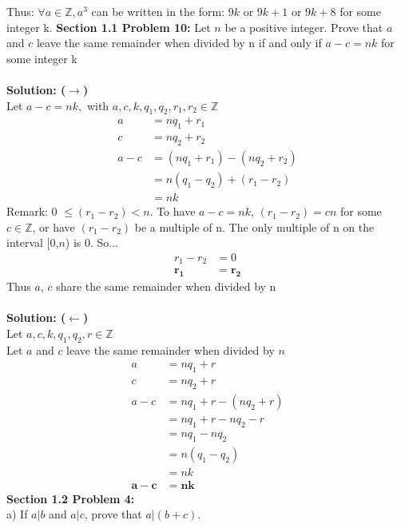 \documentclass[12pt]{article}
\begin{document}
Thus: $\forall a \in \mathbb{Z}, a^3$ can be written in the form: $9k$ or $9k + 1$ or $9k + 8$ for some integer k.
\newpage
\noindent \textbf{Section 1.1 Problem 10: } 
Let $n$ be a positive integer. Prove that $a$ and $c$ leave the same remainder when divided by n if and only if $a - c = nk$ for some integer k
\\\\
\textbf{Solution: ($\rightarrow$)} \\
Let $a-c = nk,$ \quad with $a,c,k,q_1,q_2,r_1,r_2 \in \mathbb{Z}$ \\
	\begin{align}
		a &= nq_1 + r_1 \\
		c &= nq_2 + r_2 \\
		a - c &= (nq_1 + r_1) - (nq_2 + r_2) \\
		&= n(q_1 - q_2) + (r_1 - r_2) \\
		&= nk
	\end{align}
Remark: 0 $\leq (r_1 - r_2) < n$.
To have $a - c = nk$, $(r_1 - r_2) = cn$ for some $c \in \mathbb{Z}$, or have $(r_1 - r_2)$ be a multiple of n.  The only multiple of n on the interval [0,$n$) is 0. So... \\
	\begin{align}
		r_1 - r_2 &= 0 \\
		\boldsymbol{r_1} &= \boldsymbol{r_2}
	\end{align} 
Thus $a$, $c$ share the same remainder when divided by n 
\\\\	
\textbf{Solution: ($\leftarrow$)} \\
Let $a,c,k,q_1,q_2,r \in \mathbb{Z}$ \\
Let $a$ and $c$ leave the same remainder when divided by $n$\\
	\begin{align}
		a &= nq_1 + r \\
		c &= nq_2 + r \\
		a - c &= nq_1 + r - (nq_2 + r) \\
		&= nq_1 + r - nq_2 - r \\
		&= nq_1 - nq_2 \\
		&= n(q_1 - q_2) \\
		&= nk \\
		\boldsymbol{a - c} &= \boldsymbol{nk} 
	\end{align}
\newpage
\noindent \textbf{Section 1.2 Problem 4: } \\
a) If $a|b$ and $a|c$, prove that $a|(b + c)$. \\
\end{document}
